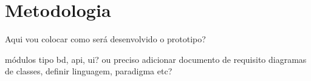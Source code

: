 \chapter{Metodologia}

Aqui vou colocar como será desenvolvido o prototipo?

módulos tipo bd, api, ui? ou preciso adicionar documento de requisito diagramas de classes, definir linguagem, paradigma etc?